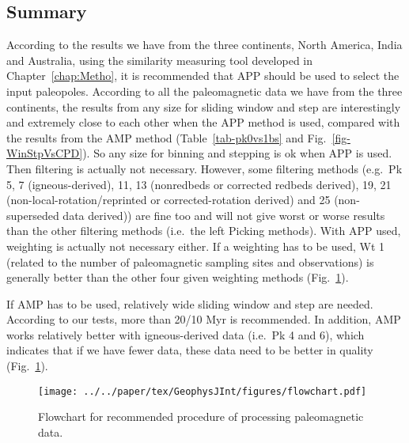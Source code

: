 \subsection{Summary}

According to the results we have from the three continents, North America, India
and Australia, using the similarity measuring tool developed in Chapter~\ref{chap:Metho}, it is
recommended that APP should be used to select the input paleopoles. According to
all the paleomagnetic data we have from the three continents, the results from
any size for sliding window and step are interestingly and extremely close to
each other when the APP method is used, compared with the results from the AMP
method (Table~\ref{tab-pk0vs1bs} and Fig.~\ref{fig-WinStpVsCPD}). So any size
for binning and stepping is ok when APP is used. Then filtering is actually not
necessary. However, some filtering methods (e.g.\ Pk 5, 7 (igneous-derived), 11,
13 (nonredbeds or corrected redbeds derived), 19, 21
(non-local-rotation/reprinted or corrected-rotation derived) and 25
(non-superseded data derived)) are fine too and will not give worst or worse
results than the other filtering methods (i.e.\ the left Picking methods). With
APP used, weighting is actually not necessary either. If a weighting has to be
used, Wt 1 (related to the number of paleomagnetic sampling sites and
observations) is generally better than the other four given weighting methods
(Fig.~\ref{fig-flow}).

If AMP has to be used, relatively wide sliding window and step are needed.
According to our tests, more than 20/10 Myr is recommended. In addition, AMP
works relatively better with igneous-derived data (i.e.\ Pk 4 and 6),
which indicates that if we have fewer data, these data need to be better in
quality (Fig.~\ref{fig-flow}).

\begin{figure}
  \centering
  \texttt{[image: ../../paper/tex/GeophysJInt/figures/flowchart.pdf]}
  \caption[Flowchart of making a reliable paleomagnetic APWP]{Flowchart for
recommended procedure of processing paleomagnetic data.}\label{fig-flow}
\end{figure}
